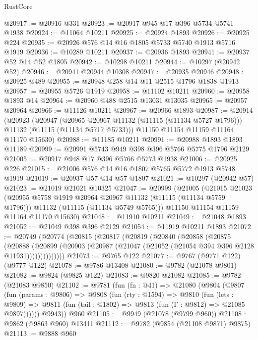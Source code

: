 \begin{lexlean}{RustCore}
\begin{coremodule}
@20917 := @20916 @331
@20923 := @20917 @945 @17 @396 @5734 @5741 @1938
@20924 := @11064 @10211
@20925 := @20924 @1893
@20926 := @20925 @224
@20935 := @20926 @576 @14 @16 @1805 @5733 @5740 @1913 @5716 @1919
@20936 := @10289 @10211
@20937 := @20936 @1893
@20941 := @20937 @52 @14 @52 @1805
@20942 := @10298 @10211
@20944 := @10297 (@20942 @52)
@20946 := @20941 @20944 @10308
@20947 := @20935 @20946
@20948 := @20925 @489
@20955 := @20948 @258 @14 @11 @2515 @1796 @1838 @1913
@20957 := @20955 @5726 @1919
@20958 := @11102 @10211
@20960 := @20958 @1893 @14
@20964 := @20960 @488 @2515 @13031 @13035
@20965 := @20957 @20964
@20966 := @11126 @10211
@20967 := @20966 @1893
@20987 := @20914
    (@20923
      (@20947
        (@20965 @20967 @11132 (@11115 (@11134 @5727 @1796)))
        @11132
        (@11115 (@11134 @5717 @5733)))
      @11150
      @11154
      @11159
      @11164
      @11170
      @15630)
@20988 := @11185 @10211
@20991 := @20988 @1893 @1893 @11189
@20999 := @20991 @5743 @949 @398 @396 @5766 @5775 @1796 @2129
@21005 := @20917 @948 @17 @396 @5766 @5773 @1938
@21006 := @20925 @226
@21015 := @21006 @576 @14 @16 @1807 @5765 @5772 @1913 @5748 @1919
@21019 := @20937 @57 @14 @57 @1807
@21021 := @10297 (@20942 @57)
@21023 := @21019 @21021 @10325
@21047 := @20999
    (@21005
      (@21015
        @21023
        (@20955 @5758 @1919 @20964 @20967 @11132 (@11115 (@11134 @5759 @1796)))
        @11132
        (@11115 (@11134 @5749 @5765)))
      @11150
      @11154
      @11159
      @11164
      @11170
      @15630)
@21048 := @11910 @10211
@21049 := @21048 @1893
@21052 := @21049 @398 @396 @2129
@21054 := @11919 @10211 @1893
@21072 := @20749
    (@20774
      (@20815
        (@20817
          (@20819
            (@20840
              (@20858
                (@20875
                  (@20888
                    (@20899
                      (@20903 (@20987 (@21047 (@21052 (@21054 @394 @396 @2128 @11931))))))))))))))
@21073 := @9765 @122
@21077 := @9767 (@9771 @122) (@9777 @122)
@21078 := @9786 @13408
@21080 := @9782 (@21078 @9801)
@21082 := @9824 (@9825 @122)
@21083 := @9820 @21082
@21085 := @9782 (@21083 @9850)
@21102 := @9781
    (fun (fn : @41) =>
    @21080
      (@9804
        (@9807
          (fun (params : @9806) =>
          @9808
            (fun (rty : @1594) =>
            @9810
              (fun (lets : @9809) =>
              @9811 (fun (tail : @1802) => @9813 (fun (Γ : @9812) => @21085 @9897))))))
        @9943))
    @960
@21105 := @9949 (@21078 (@9799 @960))
@21108 := @9862 (@9863 @960) @13411
@21112 := @9782 (@9854 (@21108 @9871) @9875)
@21113 := @9888 @960

\end{coremodule}
\end{lexlean}
